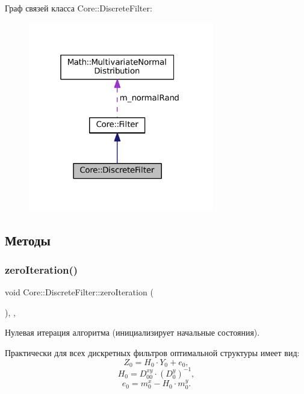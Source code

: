 Граф связей класса Core\+:\+:Discrete\+Filter\+:
\nopagebreak
\begin{figure}[H]
\begin{center}
\leavevmode
\includegraphics[width=229pt]{class_core_1_1_discrete_filter__coll__graph}
\end{center}
\end{figure}


\subsection{Методы}
\hypertarget{class_core_1_1_discrete_filter_a658617c64c7067bb6b98b5e9d78f982e}{}\label{class_core_1_1_discrete_filter_a658617c64c7067bb6b98b5e9d78f982e} 
\subsubsection{\texorpdfstring{zero\+Iteration()}{zeroIteration()}}
{\footnotesize\ttfamily void Core\+::\+Discrete\+Filter\+::zero\+Iteration (\begin{DoxyParamCaption}{ }\end{DoxyParamCaption})\hspace{0.3cm}{\ttfamily [override]}, {\ttfamily [protected]}, {\ttfamily [virtual]}}



Нулевая итерация алгоритма (инициализирует начальные состояния). 

Практически для всех дискретных фильтров оптимальной структуры имеет вид\+: \[Z_0 = H_0 \cdot Y_0 + e_0,\] \[H_0 = D_{00}^{xy} \cdot (D_0^y)^{-1},\] \[e_0 = m_0^x - H_0 \cdot m_0^y.\]

